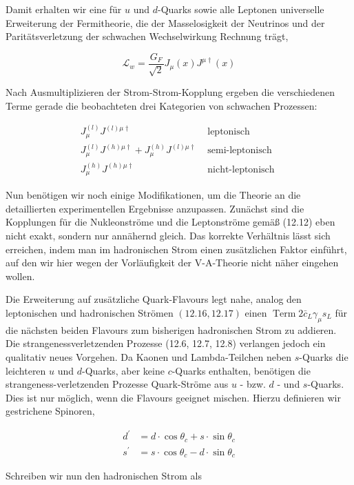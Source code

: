 \documentclass[10pt, letterpaper]{article}
\begin{document}
Damit erhalten wir eine für $u$ und $d$-Quarks sowie alle Leptonen universelle Erweiterung der Fermitheorie, die der Masselosigkeit der Neutrinos und der Paritätsverletzung der schwachen Wechselwirkung Rechnung trägt,

$$
\mathscr{L}_{w}=\frac{G_{F}}{\sqrt{2}} J_{\mu}(x) J^{\mu \dagger}(x)
$$

Nach Ausmultiplizieren der Strom-Strom-Kopplung ergeben die verschiedenen Terme gerade die beobachteten drei Kategorien von schwachen Prozessen:

$$
\begin{array}{cl}
J_{\mu}^{(l)} J^{(l) \mu \dagger} & \text { leptonisch } \\
J_{\mu}^{(l)} J^{(h) \mu \dagger}+J_{\mu}^{(h)} J^{(l) \mu \dagger} & \text { semi-leptonisch } \\
J_{\mu}^{(h)} J^{(h) \mu \dagger} & \text { nicht-leptonisch }
\end{array}
$$

Nun benötigen wir noch einige Modifikationen, um die Theorie an die detaillierten experimentellen Ergebnisse anzupassen. Zunächst sind die Kopplungen für die Nukleonströme und die Leptonströme gemäß (12.12) eben nicht exakt, sondern nur annähernd gleich. Das korrekte Verhältnis lässt sich erreichen, indem man im hadronischen Strom einen zusätzlichen Faktor einführt, auf den wir hier wegen der Vorläufigkeit der V-A-Theorie nicht näher eingehen wollen.

Die Erweiterung auf zusätzliche Quark-Flavours legt nahe, analog den leptonischen und hadronischen Strömen $(12.16,12.17)$ einen $\operatorname{Term} 2 \bar{c}_{L} \gamma_{\mu} s_{L}$ für die nächsten beiden Flavours zum bisherigen hadronischen Strom zu addieren. Die strangenessverletzenden Prozesse (12.6, 12.7, 12.8) verlangen jedoch ein qualitativ neues Vorgehen. Da Kaonen und Lambda-Teilchen neben $s$-Quarks die leichteren $u$ und $d$-Quarks, aber keine $c$-Quarks enthalten, benötigen die strangeness-verletzenden Prozesse Quark-Ströme aus $u$ - bzw. $d$ - und $s$-Quarks. Dies ist nur möglich, wenn die Flavours geeignet mischen. Hierzu definieren wir gestrichene Spinoren,

$$
\begin{aligned}
d^{\prime} & =d \cdot \cos \theta_{c}+s \cdot \sin \theta_{c} \\
s^{\prime} & =s \cdot \cos \theta_{c}-d \cdot \sin \theta_{c}
\end{aligned}
$$

Schreiben wir nun den hadronischen Strom als
\end{document}
